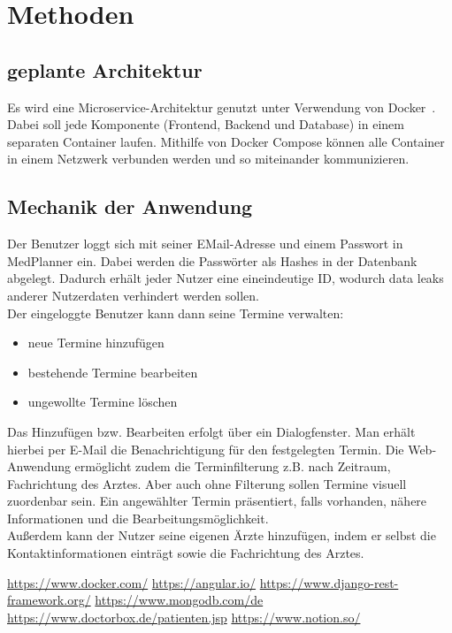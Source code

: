 \documentclass[conference]{IEEEtran}
\begin{document}
\section{Methoden}
\subsection{geplante Architektur}
Es wird eine Microservice-Architektur genutzt unter Verwendung von Docker~\cite{docker}. Dabei soll jede Komponente (Frontend, Backend und Database) in einem separaten Container laufen. Mithilfe von Docker Compose können alle Container in einem Netzwerk verbunden werden und so miteinander kommunizieren.

\subsection{Mechanik der Anwendung}
Der Benutzer loggt sich mit seiner EMail-Adresse und einem Passwort in MedPlanner ein. Dabei werden die Passwörter als Hashes in der Datenbank abgelegt. Dadurch erhält jeder Nutzer eine eineindeutige ID, wodurch data leaks anderer Nutzerdaten verhindert werden sollen.\\
Der eingeloggte Benutzer kann dann seine Termine verwalten: 
\begin{itemize}
	\item neue Termine hinzufügen
	\item bestehende Termine bearbeiten
	\item ungewollte Termine löschen
\end{itemize}

Das Hinzufügen bzw. Bearbeiten erfolgt über ein Dialogfenster.
Man erhält hierbei per E-Mail die Benachrichtigung für den festgelegten Termin.
Die Web-Anwendung ermöglicht zudem die Terminfilterung z.B. nach Zeitraum, Fachrichtung des Arztes. Aber auch ohne Filterung sollen Termine visuell zuordenbar sein. Ein angewählter Termin präsentiert, falls vorhanden, nähere Informationen und die Bearbeitungsmöglichkeit.\\
Außerdem kann der Nutzer seine eigenen Ärzte hinzufügen, indem er selbst die Kontaktinformationen einträgt sowie die Fachrichtung des Arztes.


\begin{thebibliography}{00}
 \url{https://www.docker.com/}
 \url{https://angular.io/}
 \url{https://www.django-rest-framework.org/}
 \url{https://www.mongodb.com/de}
 \url{https://www.doctorbox.de/patienten.jsp}
 \url{https://www.notion.so/}
\end{thebibliography}
\end{document}
